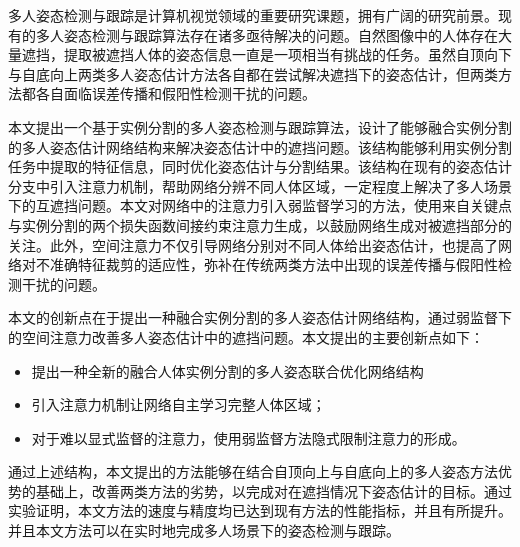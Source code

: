 \begin{cabstract}
	多人姿态检测与跟踪是计算机视觉领域的重要研究课题，拥有广阔的研究前景。现有的多人姿态检测与跟踪算法存在诸多亟待解决的问题。自然图像中的人体存在大量遮挡，提取被遮挡人体的姿态信息一直是一项相当有挑战的任务。虽然自顶向下与自底向上两类多人姿态估计方法各自都在尝试解决遮挡下的姿态估计，但两类方法都各自面临误差传播和假阳性检测干扰的问题。
  
	本文提出一个基于实例分割的多人姿态检测与跟踪算法，设计了能够融合实例分割的多人姿态估计网络结构来解决姿态估计中的遮挡问题。该结构能够利用实例分割任务中提取的特征信息，同时优化姿态估计与分割结果。该结构在现有的姿态估计分支中引入注意力机制，帮助网络分辨不同人体区域，一定程度上解决了多人场景下的互遮挡问题。本文对网络中的注意力引入弱监督学习的方法，使用来自关键点与实例分割的两个损失函数间接约束注意力生成，以鼓励网络生成对被遮挡部分的关注。此外，空间注意力不仅引导网络分别对不同人体给出姿态估计，也提高了网络对不准确特征裁剪的适应性，弥补在传统两类方法中出现的误差传播与假阳性检测干扰的问题。
  
	本文的创新点在于提出一种融合实例分割的多人姿态估计网络结构，通过弱监督下的空间注意力改善多人姿态估计中的遮挡问题。本文提出的主要创新点如下：
	\begin{itemize}
		\item 提出一种全新的融合人体实例分割的多人姿态联合优化网络结构
	 	\item 引入注意力机制让网络自主学习完整人体区域；
	 	\item 对于难以显式监督的注意力，使用弱监督方法隐式限制注意力的形成。
	\end{itemize}
  
	通过上述结构，本文提出的方法能够在结合自顶向上与自底向上的多人姿态方法优势的基础上，改善两类方法的劣势，以完成对在遮挡情况下姿态估计的目标。通过实验证明，本文方法的速度与精度均已达到现有方法的性能指标，并且有所提升。并且本文方法可以在实时地完成多人场景下的姿态检测与跟踪。

\end{cabstract}


